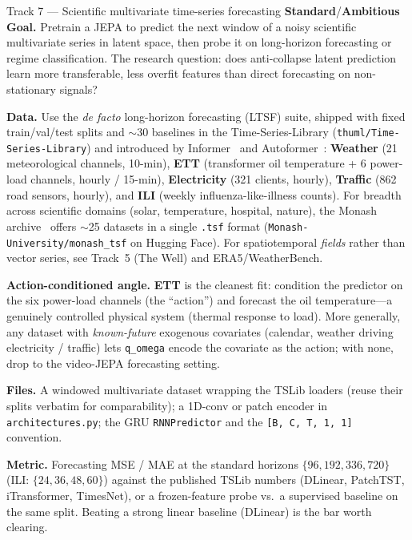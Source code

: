 \documentclass{article}
\newcommand{\code}[1]{\texttt{\small #1}}
\newcommand{\file}[1]{\texttt{\small #1}}
\newcommand{\diffmed}{\colorbox{ebamber!18}{\textcolor{ebamber}{\small\bfseries Standard}}}
\newcommand{\diffhard}{\colorbox{ebred!15}{\textcolor{ebred}{\small\bfseries Ambitious}}}
\begin{document}
\begin{trackbox}{Track 7 --- Scientific multivariate time-series forecasting \hfill \diffmed{}/\diffhard{}}
\textbf{Goal.} Pretrain a JEPA to predict the next window of a noisy scientific
multivariate series in latent space, then probe it on long-horizon forecasting or
regime classification. The research question: does anti-collapse latent prediction
learn more transferable, less overfit features than direct forecasting on
non-stationary signals?

\smallskip
\textbf{Data.} Use the \emph{de facto} long-horizon forecasting (LTSF) suite,
shipped with fixed train/val/test splits and $\sim$30 baselines in the
Time-Series-Library (\code{thuml/Time-Series-Library}) and introduced by
Informer~\citep{Informer} and Autoformer~\citep{Autoformer}: \textbf{Weather} (21
meteorological channels, 10-min), \textbf{ETT} (transformer oil temperature + 6
power-load channels, hourly / 15-min), \textbf{Electricity} (321 clients, hourly),
\textbf{Traffic} (862 road sensors, hourly), and \textbf{ILI} (weekly
influenza-like-illness counts). For breadth across scientific domains (solar,
temperature, hospital, nature), the Monash archive~\citep{MonashTSF} offers
$\sim$25 datasets in a single \code{.tsf} format (\code{Monash-University/monash\_tsf}
on Hugging Face). For spatiotemporal \emph{fields} rather than vector series, see
Track~5 (The Well) and ERA5/WeatherBench.

\smallskip
\textbf{Action-conditioned angle.} \textbf{ETT} is the cleanest fit: condition the
predictor on the six power-load channels (the ``action'') and forecast the oil
temperature---a genuinely controlled physical system (thermal response to load).
More generally, any dataset with \emph{known-future} exogenous covariates
(calendar, weather driving electricity / traffic) lets \code{q\_omega} encode the
covariate as the action; with none, drop to the video-JEPA forecasting setting.

\smallskip
\textbf{Files.} A windowed multivariate dataset wrapping the TSLib loaders (reuse
their splits verbatim for comparability); a 1D-conv or patch encoder in
\file{architectures.py}; the GRU \code{RNNPredictor} and the \code{[B, C, T, 1, 1]}
convention.

\smallskip
\textbf{Metric.} Forecasting MSE / MAE at the standard horizons
$\{96, 192, 336, 720\}$ (ILI: $\{24, 36, 48, 60\}$) against the published TSLib
numbers (DLinear, PatchTST, iTransformer, TimesNet), or a frozen-feature probe vs.\
a supervised baseline on the same split. Beating a strong linear baseline (DLinear)
is the bar worth clearing.


\end{trackbox}
\end{document}
